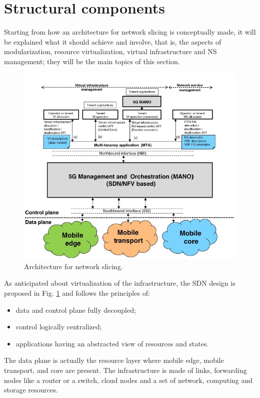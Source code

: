 \documentclass[a4paper,12pt]{report} %
\begin{document}
\newpage
\section{Structural components} 
Starting from how an architecture for network slicing is conceptually made, it will be explained what it should achieve and involve, that is, the aspects of modularization, resource virtualization, virtual infrastructure and NS management; they will be the main topics of this section.
\begin{figure}[h]
\centering
\includegraphics[scale=0.67]{pics/2.JPG}
\caption{Architecture for network slicing. \cite{al20185g}} 
\label{Arch}
\end{figure}
As anticipated about virtualization of the infrastructure, the SDN design is proposed in Fig. \ref{Arch} and follows the principles of:
\begin{itemize}
\item data and control plane fully decoupled;
\end{itemize}
\begin{itemize}
\item control logically centralized;
\end{itemize}
\begin{itemize}
\item applications having an abstracted view of resources and states.
\end{itemize}
The data plane is actually the resource layer where mobile edge, mobile transport, and core are present. The infrastructure is made of links, forwarding nodes like a router or a switch, cloud nodes  and a set of network, computing and storage resources.\\
\end{document}

